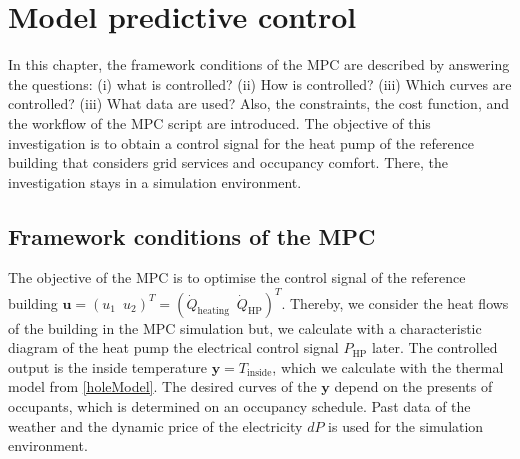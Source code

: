 \chapter{Model predictive control}
\label{ch:mpc}
In this chapter, the framework conditions of the MPC are described by answering the questions: (i) what is controlled? (ii) How is controlled? (iii) Which curves are controlled? (iii) What data are used? Also, the constraints, the cost function, and the workflow of the MPC script are introduced. The objective of this investigation is to obtain a control signal for the heat pump of the reference building that considers grid services and occupancy comfort. There, the investigation stays in a simulation environment. \newline

\section{Framework conditions of the MPC}
\label{section:FrameworkMPC}
The objective of the MPC is to optimise the control signal of the reference building $\mathbf{u} = (u_1 \enspace u_2)^T = (\dot{Q}_\text{heating} \enspace \dot{Q}_\text{HP})^T$. Thereby, we consider the heat flows of the building in the MPC simulation but, we calculate with a characteristic diagram of the heat pump the electrical control signal $P_\text{HP}$ later. The controlled output is the inside temperature $\mathbf{y} = T_\text{inside}$, which we calculate with the thermal model from \autoref{holeModel}. The desired curves of the $\mathbf{y}$ depend on the presents of occupants, which is determined on an occupancy schedule. Past data of the weather and the dynamic price of the electricity $dP$  is used for the simulation environment. 

